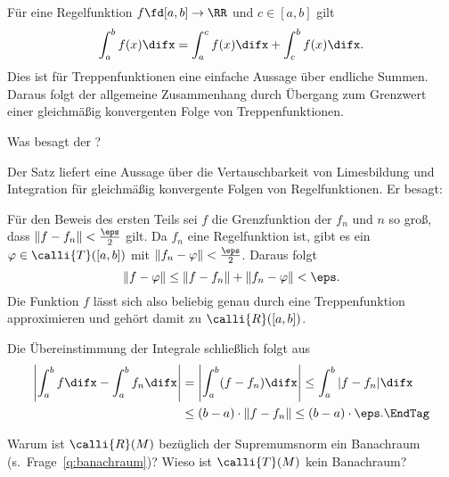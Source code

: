 \begin{antwort}
Für eine Regelfunktion $f\fd [a,b] \to \RR$ und $c\in [a,b]$ gilt
\[
\int_a^b f (x)\difx = \int_a^c f(x)\difx + \int_c^b f(x)\difx.
\]
Dies ist für Treppenfunktionen eine einfache Aussage über endliche Summen. 
Daraus folgt der allgemeine Zusammenhang durch Übergang zum Grenzwert einer 
gleichmäßig konvergenten Folge von Treppenfunktionen.  
\AntEnd 
\end{antwort}



\begin{frage}
Was besagt der ? 
\end{frage}

\begin{antwort}
Der Satz liefert eine Aussage über die Vertauschbarkeit 
von Limesbildung und Integration für gleichmäßig konvergente 
Folgen von Regelfunktionen. Er besagt: 

\medskip\noindent
{}

\noindent
Für den Beweis des ersten Teils sei $f$ die Grenzfunktion der $f_n$ und 
$n$ so groß, dass $\| f-f_n \| < \frac{\eps}{2}$ gilt. 
Da $f_n$ eine Regelfunktion ist, gibt es ein 
$\varphi\in\calli{T}([a,b])$ mit $\| f_n - \varphi \| < \frac{\eps}{2}$. 
Daraus folgt
\[
\| f- \varphi \| \le \| f-f_n \| + \| f_n - \varphi \| < \eps. 
\] 
Die Funktion $f$ lässt sich also beliebig genau durch eine 
Treppenfunktion approximieren und gehört damit zu $\calli{R}([a,b])$.

Die Übereinstimmung der Integrale schließlich folgt aus
\begin{align*}
\left| \int_a^b f \difx - \int_a^b f_n \difx \right| 
&=
\left| \int_a^b (f - f_n) \difx \right| \le  
\int_a^b | f-f_n| \difx \\
 &\le (b-a) \cdot \| f-f_n \|  \le (b-a)\cdot \eps. \EndTag
\end{align*}
\end{antwort}

\begin{frage}
Warum ist $\calli{R}(M)$ bezüglich der Supremumsnorm ein 
Banachraum (s.~Frage~\ref{q:banachraum})? 
Wieso ist $\calli{T}(M)$ kein Banachraum?
\end{frage}

